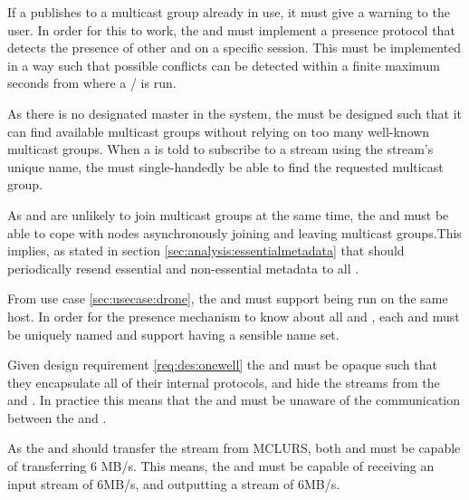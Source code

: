 If a  publishes to a multicast group already in use, it must give a warning to the user. In order for this to work, the  and  must implement a presence protocol that detects the presence of other  and  on a specific session. This must be implemented in a way such that possible conflicts can be detected within a finite maximum seconds from where a / is run.

As there is no designated master in the system, the  must be designed such that it can find available multicast groups without relying on too many well-known multicast groups. When a  is told to subscribe to a stream using the stream's unique name, the \sub{} must single-handedly be able to find the requested multicast group.


As  and  are unlikely to join multicast groups at the same time, the  and  must be able to cope with nodes asynchronously joining and leaving multicast groups.This implies, as stated in section \ref{sec:analysis:essentialmetadata} that  should periodically resend essential and non-essential metadata to all .

From use case \ref{sec:usecase:drone}, the \pubs{} and \subs{} must support being run on the same host.
In order for the presence mechanism to know about all \pubs{} and \subs{}, each \pub{} and \sub{} must be uniquely named and support having a sensible name set.

Given design requirement \ref{req:des:onewell} the  and  must be opaque such that they encapsulate all of their internal protocols, and hide the streams from the \cons{} and \pros{}. In practice this means that the  and  must be unaware of the communication between the  and .


As the \pubs{} and \subs{} should transfer the stream from MCLURS, both \pubs{} and \subs{} must be capable of transferring 6 MB/s. This means, the \subs{} and \pubs{} must be capable of receiving an input stream of 6MB/s, and outputting a stream of 6MB/s.


